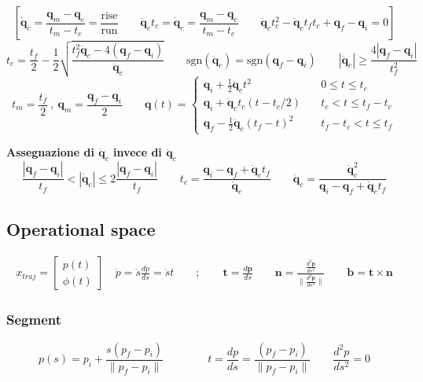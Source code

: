 $$
\left[
\bm{\dot{q}}_c 
= 
\frac{\bm{q}_m - \bm{q}_c}{t_m - t_c}
=
\frac{\text{rise}}{\text{run}}
\qquad
\bm{\ddot{q}}_c t_c
=
\bm{\dot{q}}_c
=
\frac{\bm{q}_m - \bm{q}_c}{t_m - t_c}
\qquad
\bm{\ddot{q}}_ct_c^2
-
\bm{\ddot{q}}_c t_f t_c
+
\bm{q}_f - \bm{q}_i = 0
\right]
$$
\vspace*{10pt}
$$
t_c
=
\frac{t_f}{2} - \frac{1}{2}
\sqrt{
	\frac{t_f^2 \ddot{\bm{q}}_c - 4(\bm{q}_f - \bm{q}_i)}{\bm{\ddot{q}}_c}
}
\qquad
\text{sgn}(\ddot{\bm{q}}_c)
=
\text{sgn}(\bm{q}_f - \bm{q}_i)
\qquad
|\ddot{\bm{q}}_c| \ge \frac{4|\bm{q}_f - \bm{q}_i|}{t_f^2}
$$
\vspace*{10pt}
$$
t_m = \frac{t_f}{2} \ , \ \bm{q}_m = \frac{\bm{q}_f - \bm{q}_i}{2}
\qquad
\bm{q}(t)
=
\begin{cases}
	\bm{q}_i + \frac{1}{2} \ddot{\bm{q}}_c t^2 & \quad 0 \leq t \leq t_c \\
	\bm{q}_i + \ddot{\bm{q}}_c t_c (t - t_c/2) & \quad t_c < t \leq t_f - t_c \\
	\bm{q}_f - \frac{1}{2} \ddot{\bm{q}}_c (t_f - t)^2 & \quad t_f - t_c < t \leq t_f
\end{cases}
$$


\vspace*{10pt}
\textbf{Assegnazione di $\bm{\dot{q}}_c$ invece di $\bm{\ddot{q}}_c$}
\vspace*{5pt}
$$
\frac{|\bm{q}_f - \bm{q}_i|}{t_f}
<
|\bm{\dot{q}}_c|
\leq
2 \frac{|\bm{q}_f - \bm{q}_i|}{t_f}
\qquad
t_c = \frac{\bm{q}_i - \bm{q}_f + \bm{\dot{q}}_c t_f }{\dot{\bm{q}}_c}
\qquad
\bm{\ddot{q}}_c
=
\frac{\bm{\dot{q}}_c^2}{\bm{q}_i - \bm{q}_f + \bm{\dot{q}}_c t_f}
$$





\subsection{Operational space}
\begin{align*}
	x_{traj} = \begin{bmatrix}p(t) \\ \phi(t) \end{bmatrix}
	\quad
	\dot{p} = \dot{s} \frac{dp}{ds} = \dot{s}{t}
	\qquad ; \qquad
	\bm{t} = \frac{d\bm{p}}{ds}
	\qquad
	\bm{n} = \frac{\frac{d^2 \bm{p}}{ds^2}}{\| \frac{d^2 \bm{p}}{ds^2} \|}
	\qquad
	\bm{b} = \bm{t} \times \bm{n}
\end{align*}


\subsubsection{Segment}
$$
p(s) = p_i + \frac{s(p_f - p_i)}{\| p_f - p_i \|}
\qquad \qquad
t = \frac{dp}{ds} = \frac{(p_f - p_i)}{\| p_f - p_i \|}
\qquad
\frac{d^2p}{ds^2} = 0
$$

